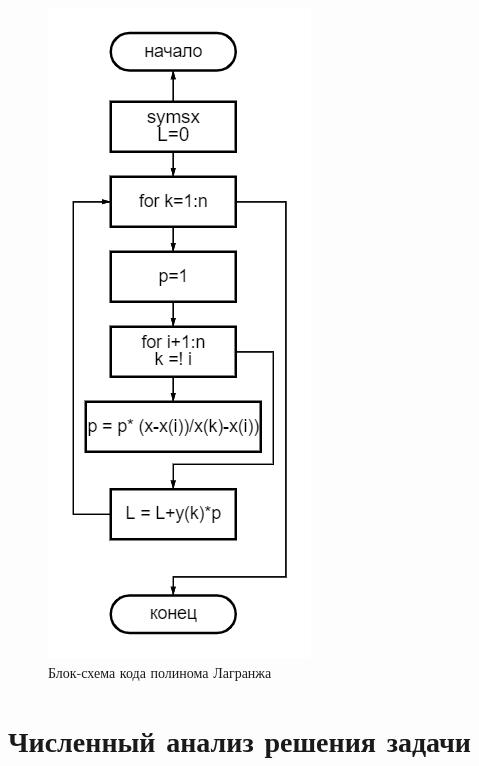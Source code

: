 \documentclass[a4paper]{article}
\begin{document}
\begin{figure}[h!]
\begin{center}
\includegraphics[scale=0.7]{diagram (6).png} 
\end{center}
\caption{Блок-схема кода полинома Лагранжа } \label{Рис2}
\end{figure}

\newpage
\section{Численный анализ решения задачи}
\end{document}
